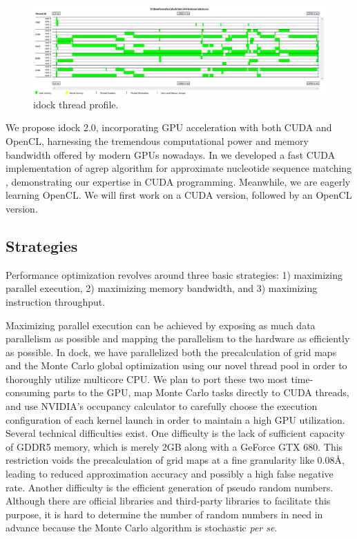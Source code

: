 \begin{figure}
\centering
\includegraphics[width=\textwidth]{idock/ThreadProfile.png}
\caption{idock thread profile.}
\label{idock:ThreadProfile}
\end{figure}

We propose idock 2.0, incorporating GPU acceleration with both CUDA and OpenCL, harnessing the tremendous computational power and memory bandwidth offered by modern GPUs nowadays. In \citeyear{1138} we developed a fast CUDA implementation of agrep algorithm for approximate nucleotide sequence matching \citep{1138}, demonstrating our expertise in CUDA programming. Meanwhile, we are eagerly learning OpenCL. We will first work on a CUDA version, followed by an OpenCL version.

\subsection{Strategies}

Performance optimization revolves around three basic strategies: 1) maximizing parallel execution, 2) maximizing memory bandwidth, and 3) maximizing instruction throughput.

Maximizing parallel execution can be achieved by exposing as much data parallelism as possible and mapping the parallelism to the hardware as efficiently as possible. In dock, we have parallelized both the precalculation of grid maps and the Monte Carlo global optimization using our novel thread pool in order to thoroughly utilize multicore CPU. We plan to port these two most time-consuming parts to the GPU, map Monte Carlo tasks directly to CUDA threads, and use NVIDIA's occupancy calculator to carefully choose the execution configuration of each kernel launch in order to maintain a high GPU utilization. Several technical difficulties exist. One difficulty is the lack of sufficient capacity of GDDR5 memory, which is merely 2GB along with a GeForce GTX 680. This restriction voids the precalculation of grid maps at a fine granularity like 0.08\AA, leading to reduced approximation accuracy and possibly a high false negative rate. Another difficulty is the efficient generation of pseudo random numbers. Although there are official libraries and third-party libraries to facilitate this purpose, it is hard to determine the number of random numbers in need in advance because the Monte Carlo algorithm is stochastic \textit{per se}.

